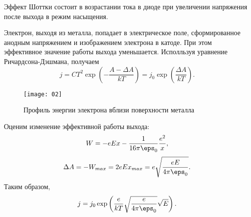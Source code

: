 Эффект Шоттки состоит в возрастании тока в диоде при увеличении напряжения после
выхода в режим насыщения.

Электрон, выходя из металла, попадает в электрическое поле, сформированное
анодным напряжением и изображением электрона в катоде. При этом эффективное
значение работы выхода уменьшается. Исполльзуя уравнение Ричардсона-Дэшмана,
получаем
\[
    j = CT^2\exp\left(-\frac{A-\Delta A}{kT}\right) =
    j_0\exp\left(\frac{\Delta A}{kT}\right).
\]
\begin{figure}[h]
\begin{center}
    \texttt{[image: 02]}
\end{center}
\caption{Профиль энергии электрона вблизи поверхности металла}
\end{figure}

Оценим изменение эффективной работы выхода:
\[
    W = -eEx - \frac{1}{16\pi\eps_0}\frac{e^2}{x},
\]
\[
    \Delta A = -W_{max} = 2eEx_{max} = e\sqrt{\frac{eE}{4\pi\eps_0}}.
\]
Таким образом,
\[
    j = j_0\exp\left(\frac{e}{kT}\sqrt{\frac{e}{4\pi\eps_0}}\sqrt{E}\right).
\]
